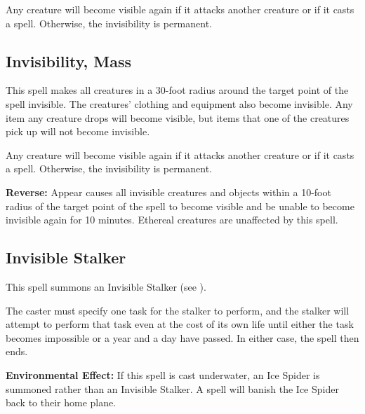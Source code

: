 \begin{multicols*}{2}
Any creature will become visible again if it attacks another creature or if it casts a spell. Otherwise, the invisibility is permanent.

\subsection{Invisibility, Mass}\label{spell:Invisibility, Mass}

This spell makes all creatures in a 30-foot radius around the target point of the spell invisible. The creatures’ clothing and equipment also become invisible. Any item any creature drops will become visible, but items that one of the creatures pick up will not become invisible.

Any creature will become visible again if it attacks another creature or if it casts a spell. Otherwise, the invisibility is permanent.

\textbf{Reverse:} \hypertarget{spell:Appear}{Appear} causes all invisible creatures and objects within a 10-foot radius of the target point of the spell to become visible and be unable to become invisible again for 10 minutes. Ethereal creatures are unaffected by this spell.

\subsection{Invisible Stalker}\label{spell:Invisible Stalker}

This spell summons an Invisible Stalker (see ).

The caster must specify one task for the stalker to perform, and the stalker will attempt to perform that task even at the cost of its own life until either the task becomes impossible or a year and a day have passed. In either case, the spell then ends.

\textbf{Environmental Effect:} If this spell is cast underwater, an Ice Spider is summoned rather than an Invisible Stalker. A  spell will banish the Ice Spider back to their home plane.


\end{multicols*}
